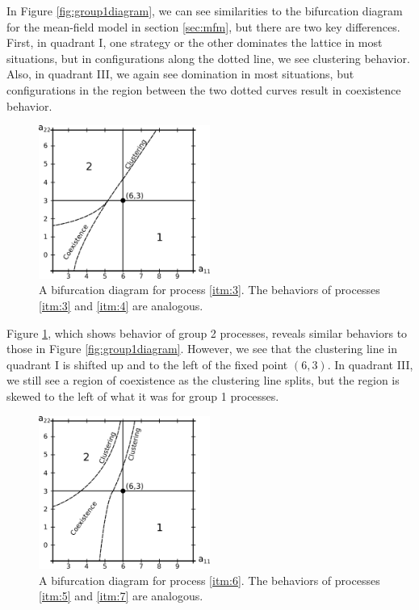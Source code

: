 \documentclass[notitlepage,reqno]{amsart}
\begin{document}
In Figure \ref{fig:group1diagram}, we can see similarities to the
bifurcation diagram for the mean-field model in section \ref{sec:mfm},
but there are two key differences. First, in quadrant I, one strategy or the
other dominates the lattice in most situations, but in configurations
along the dotted line, we see clustering behavior. Also, in quadrant
III, we again see domination in most situations, but configurations in
the region between the two dotted curves result in coexistence
behavior.

\begin{figure}[h]
\includegraphics[width=0.5\textwidth]{./images/group_2_bifurcation_diagram.eps}
\caption{
A bifurcation diagram for process \ref{itm:3}. The behaviors of
processes \ref{itm:3} and \ref{itm:4} are analogous.
}
\label{fig:group2diagram}
\end{figure}

Figure \ref{fig:group2diagram}, which shows behavior of group 2
processes, reveals similar behaviors to those in Figure
\ref{fig:group1diagram}. However, we see that the clustering line in
quadrant I is shifted up and to the left of the fixed point
$(6,3)$. In quadrant III, we still see a region of coexistence as the
clustering line splits, but the region is skewed to the left of what
it was for group 1 processes.

\begin{figure}[h]
\includegraphics[width=0.5\textwidth]{./images/group_3_bifurcation_diagram.eps}
\caption{
A bifurcation diagram for process \ref{itm:6}. The behaviors of
processes \ref{itm:5} and \ref{itm:7} are analogous.
}
\label{fig:group3diagram}
\end{figure}
\end{document}
